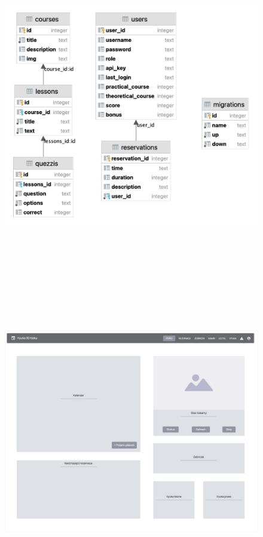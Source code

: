 \documentclass[twoside, 12pt]{article}
\begin{document}
\label{ERDpriloha}
\begin{figure}[htbp]
\centering
\includegraphics[angle=270, width=14cm]{obrazky/database.png}
\end{figure}

\label{WireframePDF2}
\begin{figure}[htbp]
\centering
\includegraphics[angle=90, height=17cm]{obrazky/wireframe.pdf}
\end{figure}
\end{document}

